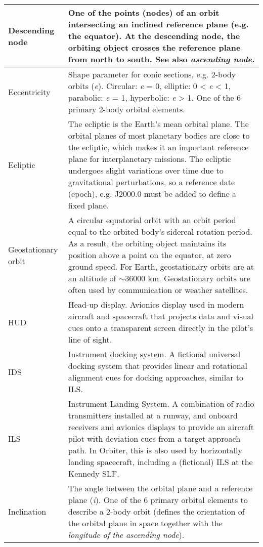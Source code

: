 \documentclass[Orbiter User Manual.tex]{subfiles}
\begin{document}
\begin{longtable}{ |p{}|p{}| }
	\hline\rule{0pt}{2ex}
	Descending node & One of the points (nodes) of an orbit intersecting an inclined reference plane (e.g. the equator). At the descending node, the orbiting object crosses the reference plane from north to south. See also \textit{ascending node}.\\
	\hline\rule{0pt}{2ex}
	Eccentricity & Shape parameter for conic sections, e.g. 2-body orbits (\textit{e}). Circular: \textit{e} = 0, elliptic: 0 < \textit{e} < 1, parabolic: \textit{e} = 1, hyperbolic: \textit{e} > 1. One of the 6 primary 2-body orbital elements.\\
	\hline\rule{0pt}{2ex}
	Ecliptic & The ecliptic is the Earth's mean orbital plane. The orbital planes of most planetary bodies are close to the ecliptic, which makes it an important reference plane for interplanetary missions. The ecliptic undergoes slight variations over time due to gravitational perturbations, so a reference date (epoch), e.g. J2000.0 must be added to define a fixed plane.\\
	\hline\rule{0pt}{2ex}
	Geostationary orbit & A circular equatorial orbit with an orbit period equal to the orbited body's sidereal rotation period. As a result, the orbiting object maintains its position above a point on the equator, at zero ground speed. For Earth, geostationary orbits are at an altitude of $\sim$36000 km. Geostationary orbits are often used by communication or weather satellites.\\
	\hline\rule{0pt}{2ex}
	HUD & Head-up display. Avionics display used in modern aircraft and spacecraft that projects data and visual cues onto a transparent screen directly in the pilot's line of sight.\\
	\hline\rule{0pt}{2ex}
	IDS & Instrument docking system. A fictional universal docking system that provides linear and rotational alignment cues for docking approaches, similar to ILS.\\
	\hline\rule{0pt}{2ex}
	ILS & Instrument Landing System. A combination of radio transmitters installed at a runway, and onboard receivers and avionics displays to provide an aircraft pilot with deviation cues from a target approach path. In Orbiter, this is also used by horizontally landing spacecraft, including a (fictional) ILS at the Kennedy SLF.\\
	\hline\rule{0pt}{2ex}
	Inclination & The angle between the orbital plane and a reference plane (\textit{i}). One of the 6 primary orbital elements to describe a 2-body orbit (defines the orientation of the orbital plane in space together with the \textit{longitude of the ascending node}).\\

\end{longtable}
\end{document}
